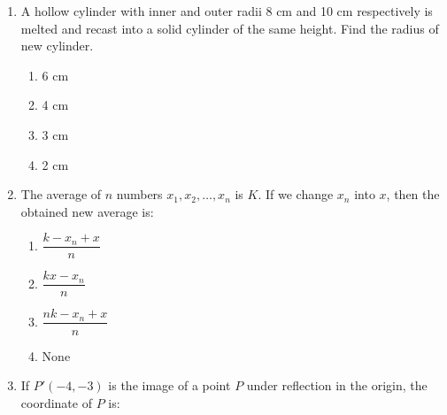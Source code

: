 \begin{enumerate}[label=(\roman*)]
        \begin{multicols}{2}
        \begin{enumerate}[label=(\alph*)]
            \item \rupee~5,000
            \item \rupee~5,560
            \item \rupee~5,450
            \item \rupee~5,900
        \end{enumerate}
        \end{multicols}

    \newpage
    \item A hollow cylinder with inner and outer radii 8 cm and 10 cm respectively 
        is melted and recast into a solid cylinder of the same height. Find the 
        radius of new cylinder.

        \begin{multicols}{2}
        \begin{enumerate}[label=(\alph*)]
            \item 6 cm
            \item 4 cm
            \item 3 cm
            \item 2 cm
        \end{enumerate}
        \end{multicols}

    \item The average of $n$ numbers $x_1, x_2, \dots, x_n$ is $K$. If we change 
        $x_n$ into $x$, then the obtained new average is:

        \begin{multicols}{2}
        \begin{enumerate}[label=(\alph*)]
            \item $\dfrac{k - x_n + x}{n}$
            \item $\dfrac{kx - x_n}{n}$
            \item $\dfrac{nk - x_n + x}{n}$
            \item None
        \end{enumerate}
        \end{multicols}

    \item If $P'(-4, -3)$ is the image of a point $P$ under reflection in 
        the origin, the coordinate of $P$ is:


\end{enumerate}
